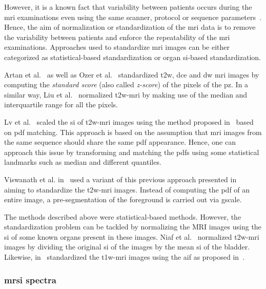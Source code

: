 \begin{enumerate}[leftmargin=*]
  However, it is a known fact that variability between patients occurs during the \ac{mri} examinations even using the same scanner, protocol or sequence parameters~\cite{Nyul1999}. Hence, the aim of normalization or standardization of the \ac{mri} data is to remove the variability between patients and enforce the repeatability of the \ac{mri} examinations. Approaches used to standardize \ac{mri} images can be either categorized as statistical-based standardization or organ \ac{si}-based standardization. 

  Artan et al.~\cite{Artan2009,Artan2010} as well as Ozer et al.~\cite{Ozer2009,Ozer2010} standardized \ac{t2w}, \ac{dce} and \ac{dw} \ac{mri} images by computing the \textit{standard score} (also called \textit{z-score}) of the pixels of the \ac{pz}. In a similar way, Liu et al.~\cite{Liu2013} normalized \ac{t2w}-\ac{mri} by making use of the median and interquartile range for all the pixels.

  Lv et al.~\cite{Lv2009} scaled the \ac{si} of \ac{t2w}-\ac{mri} images using the method proposed in~\cite{Nyul2000} based on \ac{pdf} matching. This approach is based on the assumption that \ac{mri} images from the same sequence should share the same \ac{pdf} appearance. Hence, one can approach this issue by transforming and matching the \acp{pdf} using some statistical landmarks such as median and different quantiles.

  Viswanath et al. in~\cite{Viswanath2009,Viswanath2011,Viswanath2012} used a variant of this previous approach presented in~\cite{Madabhushi2006a} aiming to standardize the \ac{t2w}-\ac{mri} images. Instead of computing the \ac{pdf} of an entire image, a pre-segmentation of the foreground is carried out via \ac{gscale}.

  The methods described above were statistical-based methods. However, the standardization problem can be tackled by normalizing the MRI images using the \ac{si} of some known organs present in these images. Niaf et al.~\cite{Niaf2011,Niaf2012} normalized \ac{t2w}-\ac{mri} images by dividing the original \ac{si} of the images by the mean \ac{si} of the bladder. Likewise, in~\cite{Niaf2011} standardized the \ac{t1w}-\ac{mri} images using the \ac{aif} as proposed in~\cite{Wiart2007}.

\end{enumerate}

\subsubsection{\ac{mrsi} spectra}

